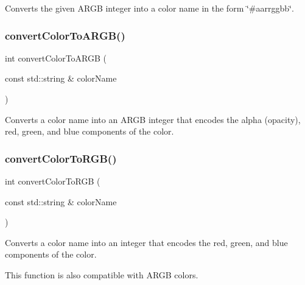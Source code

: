 Converts the given A\+R\+GB integer into a color name in the form {\ttfamily \char`\"{}\#aarrggbb\char`\"{}}. 

\mbox{\label{classGColor_a5efa1612c4ccfff89eca4ed3cfd0206d}} 
\subsubsection{\texorpdfstring{convert\+Color\+To\+A\+R\+G\+B()}{convertColorToARGB()}}
{\footnotesize\ttfamily int convert\+Color\+To\+A\+R\+GB (\begin{DoxyParamCaption}\item[{const std\+::string \&}]{color\+Name }\end{DoxyParamCaption})\hspace{0.3cm}{\ttfamily [static]}}



Converts a color name into an A\+R\+GB integer that encodes the alpha (opacity), red, green, and blue components of the color. 

\mbox{\label{classGColor_aab4a1480d396f913220aea51d117eb94}} 
\subsubsection{\texorpdfstring{convert\+Color\+To\+R\+G\+B()}{convertColorToRGB()}}
{\footnotesize\ttfamily int convert\+Color\+To\+R\+GB (\begin{DoxyParamCaption}\item[{const std\+::string \&}]{color\+Name }\end{DoxyParamCaption})\hspace{0.3cm}{\ttfamily [static]}}



Converts a color name into an integer that encodes the red, green, and blue components of the color. 

This function is also compatible with A\+R\+GB colors. \mbox{\label{classGColor_a2ad78585a77dad65eb23299714545f7c}} 

